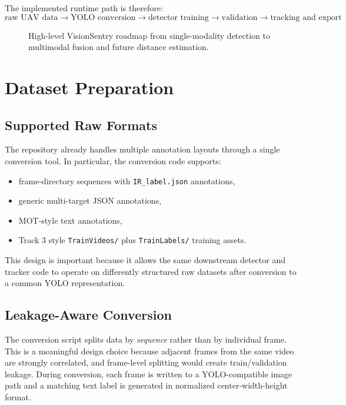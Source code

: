 \documentclass[10pt,conference]{IEEEtran}
\begin{document}
The implemented runtime path is therefore:
\[
\text{raw UAV data} \rightarrow \text{YOLO conversion} \rightarrow \text{detector training} \rightarrow \text{validation} \rightarrow \text{tracking and export}
\]

\begin{figure}[t]
\centering
{}
\caption{High-level VisionSentry roadmap from single-modality detection to multimodal fusion and future distance estimation.}
\label{fig:pipeline}
\end{figure}

\section{Dataset Preparation}
\subsection{Supported Raw Formats}
The repository already handles multiple annotation layouts through a single conversion tool. In particular, the conversion code supports:

\begin{itemize}[leftmargin=1.5em]
    \item frame-directory sequences with \texttt{IR\_label.json} annotations,
    \item generic multi-target JSON annotations,
    \item MOT-style text annotations,
    \item Track 3 style \texttt{TrainVideos/} plus \texttt{TrainLabels/} training assets.
\end{itemize}

This design is important because it allows the same downstream detector and tracker code to operate on differently structured raw datasets after conversion to a common YOLO representation.

\subsection{Leakage-Aware Conversion}
The conversion script splits data by \emph{sequence} rather than by individual frame. This is a meaningful design choice because adjacent frames from the same video are strongly correlated, and frame-level splitting would create train/validation leakage. During conversion, each frame is written to a YOLO-compatible image path and a matching text label is generated in normalized center-width-height format.
\end{document}
